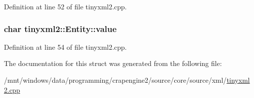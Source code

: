 Definition at line 52 of file tinyxml2.\+cpp.

\hypertarget{structtinyxml2_1_1_entity_a7334e81e33b4615655a403711b24f3ed}{
\subsubsection[{value}]{\setlength{\rightskip}{0pt plus 5cm}char tinyxml2\+::\+Entity\+::value}}\label{structtinyxml2_1_1_entity_a7334e81e33b4615655a403711b24f3ed}


Definition at line 54 of file tinyxml2.\+cpp.



The documentation for this struct was generated from the following file\+:\begin{DoxyCompactItemize}
\item 
/mnt/windows/data/programming/crapengine2/source/core/source/xml/\hyperlink{tinyxml2_8cpp}{tinyxml2.\+cpp}\end{DoxyCompactItemize}
